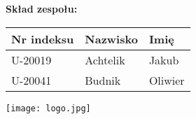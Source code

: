 
\begin{titlepage}
    \begin{center}
        \vspace{1cm}
 
        \begin{large}
            \subject\\
            \textbf{\subjectyear}

        \end{large}
        
        \vspace{0.5cm}

        \begin{Huge}
            
            \mytitle

        \end{Huge}
         
             
        \vspace{1.5cm}

        
        \begin{large}
            \textbf{Skład zespołu: }
            \begin{table}[ht]
                \centering
                \renewcommand{\arraystretch}{1.5} %
                \begin{tabular}{|p{2cm}|p{3cm}|p{4cm}|}
                  \hline
                  \textbf{Nr indeksu} & \textbf{Nazwisko} & \textbf{Imię} \\
                  \hline
                  U-20019 & Achtelik & Jakub \\
                  U-20041 & Budnik & Oliwier \\
                  \hline
                \end{tabular}
              \end{table}

        \end{large}
        
        \vfill

        \texttt{[image: logo.jpg]}

        \vfill
          
        \vspace{0.8cm}
     
        \begin{Large}
            \school\\
            \mydate\\
        \end{Large}
             
    \end{center}
 \end{titlepage}